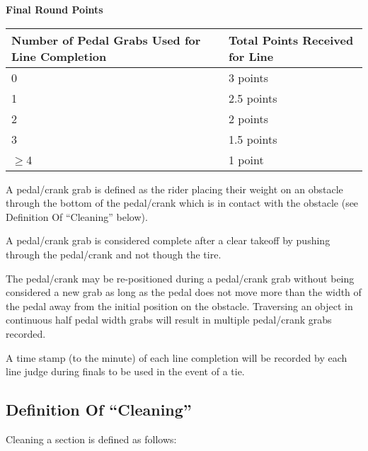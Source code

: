 \textbf{Final Round Points}

\begin{tabular}{|p{5cm}|p{4cm}|}
\hline
\textbf{Number of Pedal Grabs Used for Line Completion} & \textbf{Total Points \newline Received for Line}\\
\hline
0 & 3 points\\
\hline
1 & 2.5 points\\
\hline
2 & 2 points\\
\hline
3 & 1.5 points\\
\hline
$\geq$4 & 1 point\\
\hline
\end{tabular}

A pedal/crank grab is defined as the rider placing their weight on an obstacle through the bottom of the pedal/crank which is in contact with the obstacle (see Definition Of ``Cleaning'' below).

A pedal/crank grab is considered complete after a clear takeoff by pushing through the pedal/crank and not though the tire.

The pedal/crank may be re-positioned during a pedal/crank grab without being considered a new grab as long as the pedal does not move more than the width of the pedal away from the initial position on the obstacle.
Traversing an object in continuous half pedal width grabs will result in multiple pedal/crank grabs recorded.

A time stamp (to the minute) of each line completion will be recorded by each line judge during finals to be used in the event of a tie.


\subsection{Definition Of ``Cleaning''}
Cleaning a section is defined as follows:

